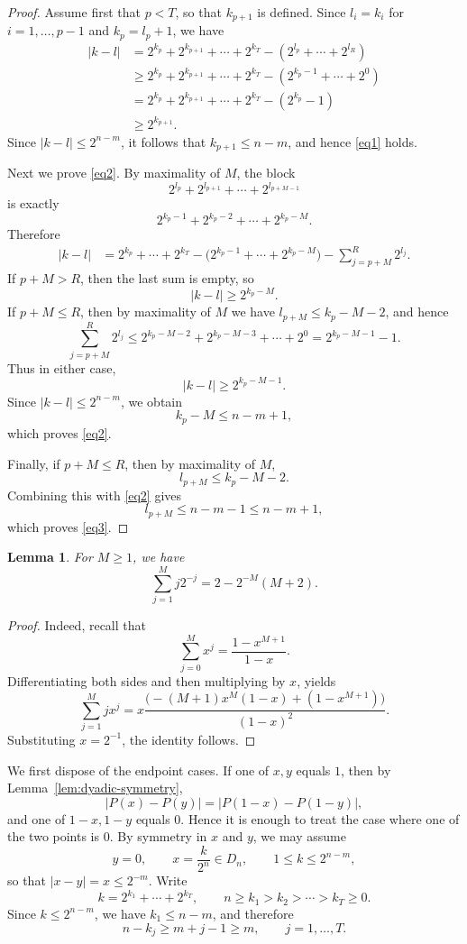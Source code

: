 \documentclass[11pt]{amsart}
\newtheorem{lemma}[theorem]{Lemma}
\theoremstyle{definition}
\renewcommand{\1}{{\mathbbm{1}}}
\begin{document}
\begin{proof}
Assume first that $p<T$, so that $k_{p+1}$ is defined. Since
$l_i=k_i$ for $i=1,\dots,p-1$ and $k_p=l_p+1$, we have
\begin{align*}
|k-l|
&=2^{k_p}+2^{k_{p+1}}+\cdots+2^{k_T}-(2^{l_p}+\cdots+2^{l_R})\\
&\ge 2^{k_p}+2^{k_{p+1}}+\cdots+2^{k_T}-(2^{k_p-1}+\cdots+2^0)\\
&=2^{k_p}+2^{k_{p+1}}+\cdots+2^{k_T}-(2^{k_p}-1)\\
&\ge 2^{k_{p+1}}.
\end{align*}
Since $|k-l|\le 2^{n-m}$, it follows that $k_{p+1}\le n-m$, and hence
\eqref{eq1} holds.

Next we prove \eqref{eq2}. By maximality of $M$, the block
\[
2^{l_p}+2^{l_{p+1}}+\cdots+2^{l_{p+M-1}}
\]
is exactly
\[
2^{k_p-1}+2^{k_p-2}+\cdots+2^{k_p-M}.
\]
Therefore
\begin{align*}
|k-l|
&=2^{k_p}+\cdots+2^{k_T}
-\bigl(2^{k_p-1}+\cdots+2^{k_p-M}\bigr)
-\sum_{j=p+M}^{R}2^{l_j}.
\end{align*}
If $p+M>R$, then the last sum is empty, so
\[
|k-l|\ge 2^{k_p-M}.
\]
If $p+M\le R$, then by maximality of $M$ we have
$l_{p+M}\le k_p-M-2$, and hence
\[
\sum_{j=p+M}^{R}2^{l_j}\le 2^{k_p-M-2}+2^{k_p-M-3}+\cdots+2^0
=2^{k_p-M-1}-1.
\]
Thus in either case,
\[
|k-l|\ge 2^{k_p-M-1}.
\]
Since $|k-l|\le 2^{n-m}$, we obtain
\[
k_p-M\le n-m+1,
\]
which proves \eqref{eq2}.

Finally, if $p+M\le R$, then by maximality of $M$,
\[
l_{p+M}\le k_p-M-2.
\]
Combining this with \eqref{eq2} gives
\[
l_{p+M}\le n-m-1\le n-m+1,
\]
which proves \eqref{eq3}.
\end{proof}

\begin{lemma}{\label{lemma_summation}}
    For $M\geq 1$, we have
    \[
    \sum_{j=1}^{M}j2^{-j} = 2-2^{-M}(M+2).
    \]
\end{lemma}
\begin{proof}
   Indeed, recall that
    \[
    \sum_{j=0}^{M}x^j = \frac{1-x^{M+1}}{1-x}.
    \]
    Differentiating both sides and then multiplying by $x$, yields 
    \[
\sum_{j=1}^{M} jx^{j}
= x\frac{\Big(-(M+1)x^M(1-x) + (1-x^{M+1})\Big)}{(1-x)^2}.
\]
    Substituting $x=2^{-1}$, the identity follows.
\end{proof}

We first dispose of the endpoint cases. If one of $x,y$ equals $1$, then by
Lemma~\ref{lem:dyadic-symmetry},
\[
|P(x)-P(y)|=|P(1-x)-P(1-y)|,
\]
and one of $1-x,1-y$ equals $0$. Hence it is enough to treat the case where one
of the two points is $0$.
By symmetry in $x$ and $y$, we may assume
\[
y=0,\qquad x=\frac{k}{2^n}\in D_n,\qquad 1\le k\le 2^{n-m},
\]
so that $|x-y|=x\le 2^{-m}$. Write
\[
k=2^{k_1}+\cdots+2^{k_T},\qquad n\ge k_1>k_2>\cdots>k_T\ge 0.
\]
Since $k\le 2^{n-m}$, we have $k_1\le n-m$, and therefore
\[
n-k_j\ge m+j-1\ge m,\qquad j=1,\dots,T.
\]
\end{document}
